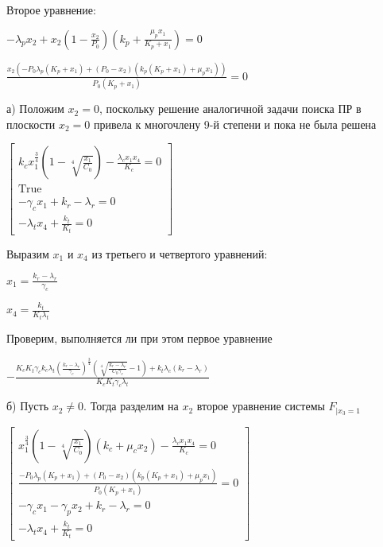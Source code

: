 \documentclass[11pt]{article}
\begin{document}
    
    Второе уравнение:

    
    $\displaystyle - \lambda_{p} x_{2} + x_{2} \left(1 - \frac{x_{2}}{P_{0}}\right) \left(k_{p} + \frac{\mu_{p} x_{1}}{K_{p} + x_{1}}\right) = 0$

    
    $\displaystyle \frac{x_{2} \left(- P_{0} \lambda_{p} \left(K_{p} + x_{1}\right) + \left(P_{0} - x_{2}\right) \left(k_{p} \left(K_{p} + x_{1}\right) + \mu_{p} x_{1}\right)\right)}{P_{0} \left(K_{p} + x_{1}\right)} = 0$

    
    а) Положим $x_2 = 0$, поскольку решение аналогичной задачи поиска ПР в плоскости $x_2=0$         привела к многочлену 9-й степени и пока не была решена

    
    $\displaystyle \left[\begin{matrix}k_{c} x_{1}^{\frac{3}{4}} \left(1 - \sqrt[4]{\frac{x_{1}}{C_{0}}}\right) - \frac{\lambda_{c} x_{1} x_{4}}{K_{c}} = 0\\\text{True}\\- \gamma_{c} x_{1} + k_{r} - \lambda_{r} = 0\\- \lambda_{t} x_{4} + \frac{k_{t}}{K_{t}} = 0\end{matrix}\right]$

    
    Выразим $x_1$ и $x_4$ из третьего и четвертого уравнений:

    
    $\displaystyle x_{1} = \frac{k_{r} - \lambda_{r}}{\gamma_{c}}$

    
    $\displaystyle x_{4} = \frac{k_{t}}{K_{t} \lambda_{t}}$

    
    Проверим, выполняется ли при этом первое уравнение

    
    $\displaystyle - \frac{K_{c} K_{t} \gamma_{c} k_{c} \lambda_{t} \left(\frac{k_{r} - \lambda_{r}}{\gamma_{c}}\right)^{\frac{3}{4}} \left(\sqrt[4]{\frac{k_{r} - \lambda_{r}}{C_{0} \gamma_{c}}} - 1\right) + k_{t} \lambda_{c} \left(k_{r} - \lambda_{r}\right)}{K_{c} K_{t} \gamma_{c} \lambda_{t}}$

    
    б) Пусть $x_2 \neq 0$. Тогда разделим на $x_2$ второе уравнение системы $F_{\big|x_3 = 1}$

    
    $\displaystyle \left[\begin{matrix}x_{1}^{\frac{3}{4}} \left(1 - \sqrt[4]{\frac{x_{1}}{C_{0}}}\right) \left(k_{c} + \mu_{c} x_{2}\right) - \frac{\lambda_{c} x_{1} x_{4}}{K_{c}} = 0\\\frac{- P_{0} \lambda_{p} \left(K_{p} + x_{1}\right) + \left(P_{0} - x_{2}\right) \left(k_{p} \left(K_{p} + x_{1}\right) + \mu_{p} x_{1}\right)}{P_{0} \left(K_{p} + x_{1}\right)} = 0\\- \gamma_{c} x_{1} - \gamma_{p} x_{2} + k_{r} - \lambda_{r} = 0\\- \lambda_{t} x_{4} + \frac{k_{t}}{K_{t}} = 0\end{matrix}\right]$
\end{document}

